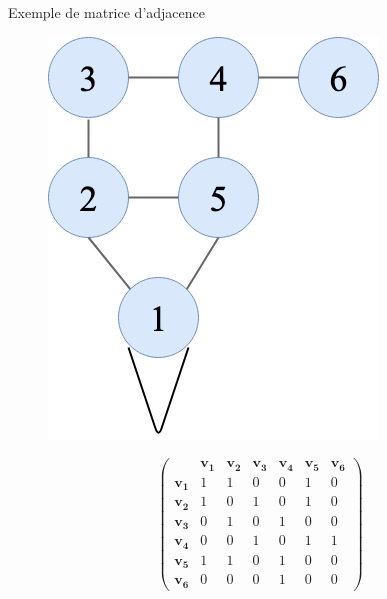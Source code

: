 \documentclass[10pt,xcolor=dvipsnames]{beamer}
\begin{document}
\begin{frame}{Exemple de matrice d'adjacence}
    \begin{minipage}{0.6\textwidth}
    \begin{figure}
        \centering
        \includegraphics[scale=0.3]{figures/CM3/adj-matrix.png}
        \label{fig:my_label}
    \end{figure}
    \end{minipage}
    \begin{minipage}{0.35\textwidth}
    $$
    \begin{pmatrix}
\quad & \boldsymbol{v_1} & \boldsymbol{v_2} & \boldsymbol{v_3} & \boldsymbol{v_4} & \boldsymbol{v_5} & \boldsymbol{v_6}\\
\boldsymbol{v_1} & 1 & 1 & 0 & 0 & 1 & 0\\
\boldsymbol{v_2} & 1 & 0 & 1 & 0 & 1 & 0\\
\boldsymbol{v_3} & 0 & 1 & 0 & 1 & 0 & 0\\
\boldsymbol{v_4} & 0 & 0 & 1 & 0 & 1 & 1\\
\boldsymbol{v_5} & 1 & 1 & 0 & 1 & 0 & 0\\
\boldsymbol{v_6} & 0 & 0 & 0 & 1 & 0 & 0
\end{pmatrix}
$$
    \end{minipage}
\end{frame}
\end{document}
